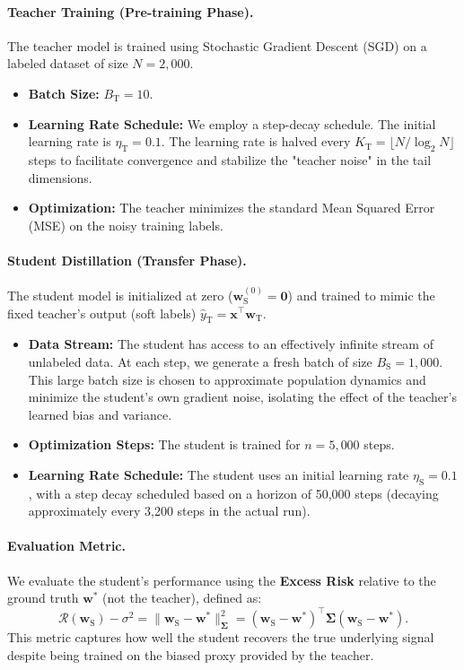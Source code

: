 \documentclass{article}
\theoremstyle{definition}
\theoremstyle{definition}
\theoremstyle{plain}
\theoremstyle{plain}
\theoremstyle{plain}
\theoremstyle{plain}
\theoremstyle{plain}
\begin{document}
\paragraph{Teacher Training (Pre-training Phase).}
The teacher model is trained using Stochastic Gradient Descent (SGD) on a labeled dataset of size $N=2,000$.
\begin{itemize}
    \item \textbf{Batch Size:} $B_{\text{T}} = 10$.
    \item \textbf{Learning Rate Schedule:} We employ a step-decay schedule. The initial learning rate is $\eta_{\text{T}} = 0.1$. The learning rate is halved every $K_{\text{T}} = \lfloor N / \log_2 N \rfloor$ steps to facilitate convergence and stabilize the "teacher noise" in the tail dimensions.
    \item \textbf{Optimization:} The teacher minimizes the standard Mean Squared Error (MSE) on the noisy training labels.
\end{itemize}

\paragraph{Student Distillation (Transfer Phase).}
The student model is initialized at zero ($\mathbf{w}_{\text{S}}^{(0)} = \mathbf{0}$) and trained to mimic the fixed teacher's output (soft labels) $\hat{y}_{\text{T}} = \mathbf{x}^\top \mathbf{w}_{\text{T}}$.
\begin{itemize}
    \item \textbf{Data Stream:} The student has access to an effectively infinite stream of unlabeled data. At each step, we generate a fresh batch of size $B_{\text{S}} = 1,000$. This large batch size is chosen to approximate population dynamics and minimize the student's own gradient noise, isolating the effect of the teacher's learned bias and variance.
    \item \textbf{Optimization Steps:} The student is trained for $n=5,000$ steps.
    \item \textbf{Learning Rate Schedule:} The student uses an initial learning rate $\eta_{\text{S}} = 0.1$, with a step decay scheduled based on a horizon of 50,000 steps (decaying approximately every 3,200 steps in the actual run).
\end{itemize}

\paragraph{Evaluation Metric.}
We evaluate the student's performance using the \textbf{Excess Risk} relative to the ground truth $\mathbf{w}^*$ (not the teacher), defined as:
\begin{equation}
    \mathcal{R}(\mathbf{w}_{\text{S}}) - \sigma^2 = \|\mathbf{w}_{\text{S}} - \mathbf{w}^*\|_{\boldsymbol{\Sigma}}^2 = (\mathbf{w}_{\text{S}} - \mathbf{w}^*)^\top \boldsymbol{\Sigma} (\mathbf{w}_{\text{S}} - \mathbf{w}^*).
\end{equation}
This metric captures how well the student recovers the true underlying signal despite being trained on the biased proxy provided by the teacher.
\end{document}
